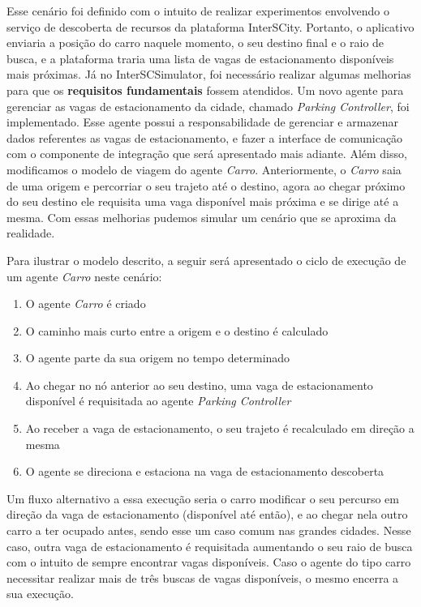 Esse cenário foi definido com o intuito de realizar experimentos envolvendo o serviço de descoberta de recursos da plataforma InterSCity.
Portanto, o aplicativo enviaria a posição do carro naquele momento, o seu destino final e o raio de busca, e a plataforma traria uma lista de vagas de estacionamento
disponíveis mais próximas.
Já no InterSCSimulator, foi necessário realizar algumas melhorias para que os \textbf{requisitos fundamentais} fossem atendidos.
Um novo agente para gerenciar as vagas de estacionamento da cidade, chamado \textit{Parking Controller}, foi implementado.
Esse agente possui a responsabilidade de gerenciar e armazenar dados referentes as vagas de estacionamento, e fazer a interface de comunicação com o componente de
integração que será apresentado mais adiante.
Além disso, modificamos o modelo de viagem do agente \textit{Carro}.
Anteriormente, o \textit{Carro} saia de uma origem e percorriar o seu trajeto até o destino, agora ao chegar próximo do seu destino ele requisita uma vaga disponível mais
próxima e se dirige até a mesma.
Com essas melhorias pudemos simular um cenário que se aproxima da realidade.

Para ilustrar o modelo descrito, a seguir será apresentado o ciclo de execução de um agente \textit{Carro} neste cenário:

\begin{enumerate}
    \item O agente \textit{Carro} é criado

    \item O caminho mais curto entre a origem e o destino é calculado

    \item O agente parte da sua origem no tempo determinado

    \item Ao chegar no nó anterior ao seu destino, uma vaga de estacionamento disponível é requisitada ao agente \textit{Parking Controller}

    \item Ao receber a vaga de estacionamento, o seu trajeto é recalculado em direção a mesma

    \item O agente se direciona e estaciona na vaga de estacionamento descoberta 
\end{enumerate}

Um fluxo alternativo a essa execução seria o carro modificar o seu percurso em direção da vaga de estacionamento (disponível até então), e ao chegar nela outro
carro a ter ocupado antes, sendo esse um caso comum nas grandes cidades.
Nesse caso, outra vaga de estacionamento é requisitada aumentando o seu raio de busca com o intuito de sempre encontrar vagas disponíveis.
Caso o agente do tipo carro necessitar realizar mais de três buscas de vagas disponíveis, o mesmo encerra a sua execução.

